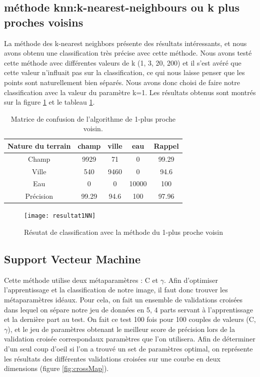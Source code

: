 \documentclass[a4paper,10pt]{article}
\begin{document}
\subsection{méthode knn:k-nearest-neighbours ou k plus proches voisins}
La méthode des k-nearest neighbors présente des résultats intéressants, et nous avons obtenu une classification très précise avec cette méthode. Nous avons testé cette méthode avec différentes valeurs de k (1, 3, 20, 200) et il s'est avéré que cette valeur n'influait pas sur la classification, ce qui nous laisse penser que les points sont naturellement bien séparés. Nous avons donc choisi de faire notre classification avec la valeur du paramètre k=1. Les résultats obtenus sont montrés sur la figure \ref{fig:1NN} et le tableau \ref{table:1NN}.
\begin{table}
\begin{center}
 \begin{tabular}{|c|c|c|c|c|}
  \hline
  Nature du terrain & champ & ville & eau & Rappel \\
  \hline
Champ & 9929 & 71 & 	0 &	99.29 \\
Ville & 540 &	9460 &	0 &	94.6 \\
Eau &  0 &	0 &	10000 &	100 \\
Précision & 99.29 & 94.6 & 100 & 97.96 \\
  \hline
\end{tabular}
\end{center}
\label{table:1NN}
\caption{Matrice de confusion de l'algorithme de 1-plus proche voisin.}
\end{table}

\begin{figure}
  \centering
    \texttt{[image: resultat1NN]}
  \caption{Résutat de classification avec la méthode du 1-plus proche voisin}
  \label{fig:1NN}
\end{figure}

\subsection{Support Vecteur Machine}
Cette méthode utilise deux métaparamètres : C et $\gamma$. Afin d'optimiser l'apprentissage et la classification de notre image, il faut donc trouver les métaparamètres idéaux. Pour cela, on fait un ensemble de validations croisées dans lequel on sépare notre jeu de données en 5, 4 parts servant à l'apprentissage et la dernière part au test. On fait ce test 100 fois pour 100 couples de valeurs (C,$\gamma$), et le jeu de paramètres obtenant le meilleur score de précision lors de la validation croisée correspondaux paramètres que l'on utilisera. Afin de déterminer d'un seul coup d'oeil si l'on a trouvé un set de paramètres optimal, on représente les résultats des différentes validations croisées sur une courbe en deux dimensions (figure \ref{fig:crossMap}).
\end{document}
